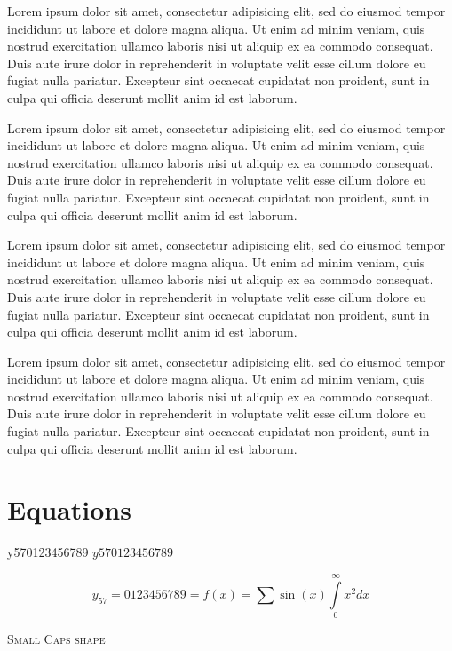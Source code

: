 \documentclass[10pt,a4paper,extrafontsizes,oldfontcommands,oneside]{memoir}
\begin{document}
Lorem ipsum dolor sit amet, consectetur adipisicing elit, sed do eiusmod tempor incididunt ut labore et dolore magna aliqua. Ut enim ad minim veniam, quis nostrud exercitation ullamco laboris nisi ut aliquip ex ea commodo consequat. Duis aute irure dolor in reprehenderit in voluptate velit esse cillum dolore eu fugiat nulla pariatur. Excepteur sint occaecat cupidatat non proident, sunt in culpa qui officia deserunt mollit anim id est laborum.

Lorem ipsum dolor sit amet, consectetur adipisicing elit, sed do eiusmod tempor incididunt ut labore et dolore magna aliqua. Ut enim ad minim veniam, quis nostrud exercitation ullamco laboris nisi ut aliquip ex ea commodo consequat. Duis aute irure dolor in reprehenderit in voluptate velit esse cillum dolore eu fugiat nulla pariatur. Excepteur sint occaecat cupidatat non proident, sunt in culpa qui officia deserunt mollit anim id est laborum.

Lorem ipsum dolor sit amet, consectetur adipisicing elit, sed do eiusmod tempor incididunt ut labore et dolore magna aliqua. Ut enim ad minim veniam, quis nostrud exercitation ullamco laboris nisi ut aliquip ex ea commodo consequat. Duis aute irure dolor in reprehenderit in voluptate velit esse cillum dolore eu fugiat nulla pariatur. Excepteur sint occaecat cupidatat non proident, sunt in culpa qui officia deserunt mollit anim id est laborum.

Lorem ipsum dolor sit amet, consectetur adipisicing elit, sed do eiusmod tempor incididunt ut labore et dolore magna aliqua. Ut enim ad minim veniam, quis nostrud exercitation ullamco laboris nisi ut aliquip ex ea commodo consequat. Duis aute irure dolor in reprehenderit in voluptate velit esse cillum dolore eu fugiat nulla pariatur. Excepteur sint occaecat cupidatat non proident, sunt in culpa qui officia deserunt mollit anim id est laborum.

\clearpage
\section{Equations}

y570123456789 $y570123456789$

\[
y_{57}=0123456789=f(x)=\sum\sin(x)\int\limits_0^{\infty}x^2 dx
\]

% 

{\scshape Small Caps shape}
\end{document}

